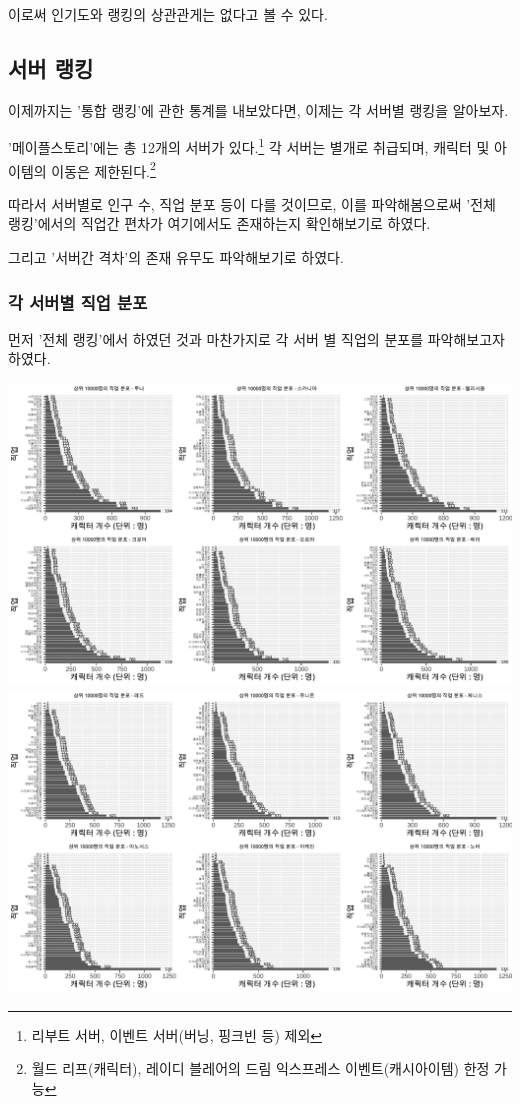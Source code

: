 \documentclass[
]{article}
\begin{document}
이로써 인기도와 랭킹의 상관관게는 없다고 볼 수 있다.

\hypertarget{uxc11cuxbc84-uxb7aduxd0b9}{%
\subsection{서버 랭킹}\label{uxc11cuxbc84-uxb7aduxd0b9}}

이제까지는 '통합 랭킹'에 관한 통계를 내보았다면, 이제는 각 서버별 랭킹을
알아보자.

'메이플스토리'에는 총 12개의 서버가 있다.\footnote{리부트 서버, 이벤트
  서버(버닝, 핑크빈 등) 제외} 각 서버는 별개로 취급되며, 캐릭터 및
아이템의 이동은 제한된다.\footnote{월드 리프(캐릭터), 레이디 블레어의
  드림 익스프레스 이벤트(캐시아이템) 한정 가능}

따라서 서버별로 인구 수, 직업 분포 등이 다를 것이므로, 이를
파악해봄으로써 '전체 랭킹'에서의 직업간 편차가 여기에서도 존재하는지
확인해보기로 하였다.

그리고 '서버간 격차'의 존재 유무도 파악해보기로 하였다.

\hypertarget{uxac01-uxc11cuxbc84uxbcc4-uxc9c1uxc5c5-uxbd84uxd3ec}{%
\subsubsection{각 서버별 직업
분포}\label{uxac01-uxc11cuxbc84uxbcc4-uxc9c1uxc5c5-uxbd84uxd3ec}}

먼저 '전체 랭킹'에서 하였던 것과 마찬가지로 각 서버 별 직업의 분포를
파악해보고자 하였다.

\includegraphics{123_files/figure-latex/ranking_server_job-1.pdf}
\includegraphics{123_files/figure-latex/ranking_server_job-2.pdf}
\end{document}
